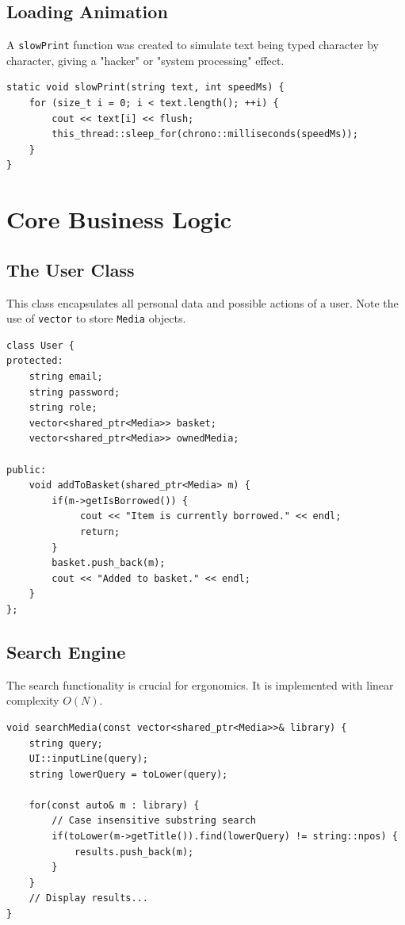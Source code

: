 \documentclass[12pt,a4paper]{report}
\begin{document}
\subsection{Loading Animation}
A \texttt{slowPrint} function was created to simulate text being typed character by character, giving a "hacker" or "system processing" effect.

\begin{lstlisting}[caption={Typewriter Effect Function}]
static void slowPrint(string text, int speedMs) {
    for (size_t i = 0; i < text.length(); ++i) {
        cout << text[i] << flush;
        this_thread::sleep_for(chrono::milliseconds(speedMs));
    }
}
\end{lstlisting}

\section{Core Business Logic}

\subsection{The User Class}
This class encapsulates all personal data and possible actions of a user. Note the use of \texttt{vector} to store \texttt{Media} objects.

\begin{lstlisting}[caption={User Class Extract}]
class User {
protected:
    string email;
    string password;
    string role;
    vector<shared_ptr<Media>> basket;
    vector<shared_ptr<Media>> ownedMedia;

public:
    void addToBasket(shared_ptr<Media> m) {
        if(m->getIsBorrowed()) {
             cout << "Item is currently borrowed." << endl;
             return;
        }
        basket.push_back(m);
        cout << "Added to basket." << endl;
    }
};
\end{lstlisting}

\subsection{Search Engine}
The search functionality is crucial for ergonomics. It is implemented with linear complexity $O(N)$.

\begin{lstlisting}[caption={Search Algorithm}]
void searchMedia(const vector<shared_ptr<Media>>& library) {
    string query;
    UI::inputLine(query);
    string lowerQuery = toLower(query);
    
    for(const auto& m : library) {
        // Case insensitive substring search
        if(toLower(m->getTitle()).find(lowerQuery) != string::npos) {
            results.push_back(m);
        }
    }
    // Display results...
}
\end{lstlisting}
\end{document}
